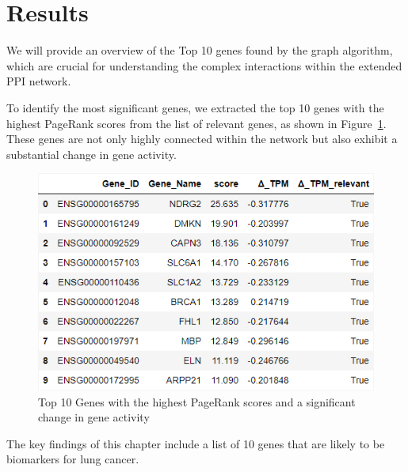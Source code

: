 \section{Results} \label{sec:results}

{\color{lightgray}
We will provide an overview of the Top 10 genes found by the graph algorithm,
which are crucial for understanding the complex interactions within the extended PPI network.


To identify the most significant genes, we extracted the top 10 genes with the highest PageRank scores from the list of relevant genes,
as shown in Figure~\ref{fig:03_03_df_pagerank_relevant}.
These genes are not only highly connected within the network but also exhibit a substantial change in gene activity.

\begin{figure}[h]
    \centering
    \includegraphics[height=\dfheightdouble]{figures/03_03_df_pagerank_relevant}
    \caption{Top 10 Genes with the highest PageRank scores and a significant change in gene activity}
    \label{fig:03_03_df_pagerank_relevant}
\end{figure}


The key findings of this chapter include a list of 10 genes that are likely to be biomarkers for lung cancer.
}